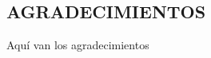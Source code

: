 \thispagestyle{empty}
\begin{titlepage}
\begin{center}
\section*{AGRADECIMIENTOS}
\end{center}


\begin{flushleft}

  Aquí van los agradecimientos

\end{flushleft}
\end{titlepage}
